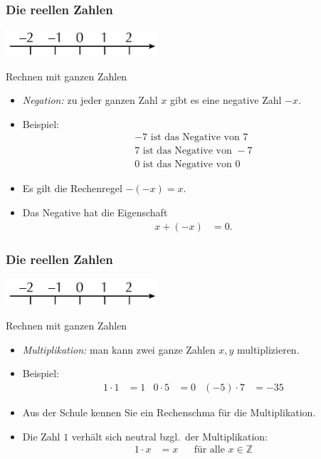 \documentclass{beamer}
\renewcommand{\emph}[1]{{\textcolor{solarizedRed}{\itshape #1}}}
\newcommand\ZZ{\mathbb Z}
\renewcommand{\ae}{\"a}
\newcommand{\ue}{\"u}
\newcommand{\mytitle}{Die reellen Zahlen}
\begin{document}
\begin{frame}\frametitle{\mytitle}
	\hfill\includegraphics[height=10mm]{pics/integers.pdf}
	\begin{block}{Rechnen mit ganzen Zahlen}
		\begin{itemize}
			\item \emph{Negation:} zu jeder ganzen Zahl $x$ gibt es eine negative Zahl $-x$.
			\item Beispiel:
				\begin{align*}
					-7\mbox{ ist das Negative von }7\\
					7\mbox{ ist das Negative von }-7\\
					0\mbox{ ist das Negative von }0
				\end{align*}
			\item Es gilt die Rechenregel $-(-x)=x$.
			\item Das Negative hat die Eigenschaft
				\begin{align*}
					x+(-x)&=0.
				\end{align*}
		\end{itemize}
	\end{block}
\end{frame}

\begin{frame}\frametitle{\mytitle}
	\hfill\includegraphics[height=10mm]{pics/integers.pdf}
	\begin{block}{Rechnen mit ganzen Zahlen}
		\begin{itemize}
			\item \emph{Multiplikation:} man kann zwei ganze Zahlen $x,y$ multiplizieren.
			\item Beispiel:
				\begin{align*}
					1\cdot 1&=1&0\cdot 5&=0&(-5)\cdot7&=-35
				\end{align*}
			\item Aus der Schule kennen Sie ein Rechenschma f\ue r die Multiplikation.
			\item Die Zahl $1$ verh\ae lt sich neutral bzgl.\ der Multiplikation:
				\begin{align*}
					1\cdot x&=x&&\mbox{f\ue r alle }x\in\ZZ
				\end{align*}
		\end{itemize}
	\end{block}
\end{frame}
\end{document}
